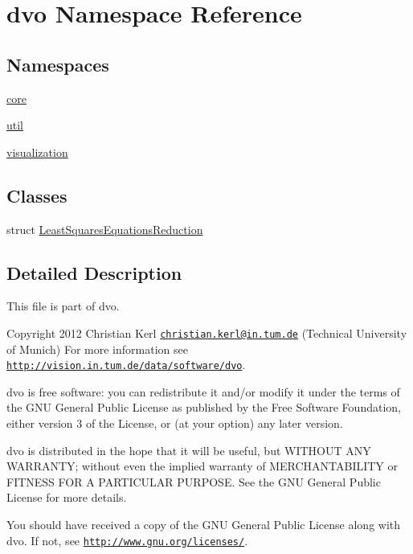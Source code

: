 \hypertarget{namespacedvo}{}\section{dvo Namespace Reference}
\label{namespacedvo}
\subsection*{Namespaces}
\begin{DoxyCompactItemize}
\item 
 \mbox{\hyperlink{namespacedvo_1_1core}{core}}
\item 
 \mbox{\hyperlink{namespacedvo_1_1util}{util}}
\item 
 \mbox{\hyperlink{namespacedvo_1_1visualization}{visualization}}
\end{DoxyCompactItemize}
\subsection*{Classes}
\begin{DoxyCompactItemize}
\item 
struct \mbox{\hyperlink{structdvo_1_1_least_squares_equations_reduction}{Least\+Squares\+Equations\+Reduction}}
\end{DoxyCompactItemize}


\subsection{Detailed Description}
This file is part of dvo.

Copyright 2012 Christian Kerl \href{mailto:christian.kerl@in.tum.de}{\tt christian.\+kerl@in.\+tum.\+de} (Technical University of Munich) For more information see \href{http://vision.in.tum.de/data/software/dvo}{\tt http\+://vision.\+in.\+tum.\+de/data/software/dvo}.

dvo is free software\+: you can redistribute it and/or modify it under the terms of the G\+NU General Public License as published by the Free Software Foundation, either version 3 of the License, or (at your option) any later version.

dvo is distributed in the hope that it will be useful, but W\+I\+T\+H\+O\+UT A\+NY W\+A\+R\+R\+A\+N\+TY; without even the implied warranty of M\+E\+R\+C\+H\+A\+N\+T\+A\+B\+I\+L\+I\+TY or F\+I\+T\+N\+E\+SS F\+OR A P\+A\+R\+T\+I\+C\+U\+L\+AR P\+U\+R\+P\+O\+SE. See the G\+NU General Public License for more details.

You should have received a copy of the G\+NU General Public License along with dvo. If not, see \href{http://www.gnu.org/licenses/}{\tt http\+://www.\+gnu.\+org/licenses/}. 
